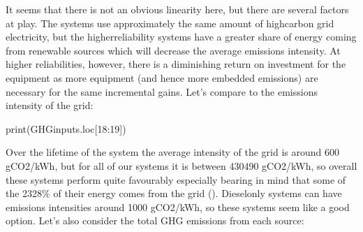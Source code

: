 \documentclass[letterpaper,10pt,english]{sphinxmanual}
\begin{document}
\begin{DUlineblock}{0em}
\item[] 
\end{DUlineblock}

\sphinxAtStartPar
It seems that there is not an obvious linearity here, but there are
several factors at play. The systems use approximately the same amount
of high\sphinxhyphen{}carbon grid electricity, but the higher\sphinxhyphen{}reliability systems have
a greater share of energy coming from renewable sources which will
decrease the average emissions intensity. At higher reliabilities,
however, there is a diminishing return on investment for the equipment
as more equipment (and hence more embedded emissions) are necessary for
the same incremental gains. Let’s compare to the emissions intensity of
the grid:

\begin{sphinxVerbatim}[commandchars=\\\{\}]
print(GHG\PYGZus{}inputs.loc[18:19])
\end{sphinxVerbatim}

\begin{sphinxVerbatim}[commandchars=\\\{\}]
                                    
        
          
\end{sphinxVerbatim}

\sphinxAtStartPar
Over the lifetime of the system the average intensity of the grid is
around 600 gCO2/kWh, but for all of our systems it is between 430\sphinxhyphen{}490
gCO2/kWh, so overall these systems perform quite favourably \sphinxhyphen{} especially
bearing in mind that some of the 23\sphinxhyphen{}28\% of their energy comes from the
grid (). Diesel\sphinxhyphen{}only systems can have emissions
intensities around 1000 gCO2/kWh, so these systems seem like a good
option. Let’s also consider the total GHG emissions from each source:
\end{document}
